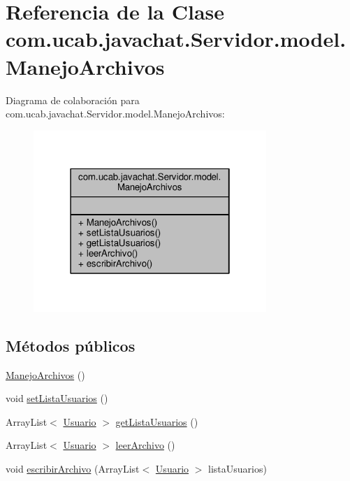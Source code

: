\hypertarget{classcom_1_1ucab_1_1javachat_1_1_servidor_1_1model_1_1_manejo_archivos}{\section{Referencia de la Clase com.\-ucab.\-javachat.\-Servidor.\-model.\-Manejo\-Archivos}
\label{classcom_1_1ucab_1_1javachat_1_1_servidor_1_1model_1_1_manejo_archivos}
}


Diagrama de colaboración para com.\-ucab.\-javachat.\-Servidor.\-model.\-Manejo\-Archivos\-:\nopagebreak
\begin{figure}[H]
\begin{center}
\leavevmode
\includegraphics[width=250pt]{classcom_1_1ucab_1_1javachat_1_1_servidor_1_1model_1_1_manejo_archivos__coll__graph}
\end{center}
\end{figure}
\subsection*{Métodos públicos}
\begin{DoxyCompactItemize}
\item 
\hyperlink{classcom_1_1ucab_1_1javachat_1_1_servidor_1_1model_1_1_manejo_archivos_a61dcba785a704949bc4b84a87a223463}{Manejo\-Archivos} ()
\item 
void \hyperlink{classcom_1_1ucab_1_1javachat_1_1_servidor_1_1model_1_1_manejo_archivos_a5776d41af3206be2ef21722c54581bdb}{set\-Lista\-Usuarios} ()
\item 
Array\-List$<$ \hyperlink{classcom_1_1ucab_1_1javachat_1_1_servidor_1_1model_1_1_usuario}{Usuario} $>$ \hyperlink{classcom_1_1ucab_1_1javachat_1_1_servidor_1_1model_1_1_manejo_archivos_a659469300b3d725e66d26460107200b6}{get\-Lista\-Usuarios} ()
\item 
Array\-List$<$ \hyperlink{classcom_1_1ucab_1_1javachat_1_1_servidor_1_1model_1_1_usuario}{Usuario} $>$ \hyperlink{classcom_1_1ucab_1_1javachat_1_1_servidor_1_1model_1_1_manejo_archivos_ad6301dc8f0af55ea43b53da2c7f8b0d3}{leer\-Archivo} ()
\item 
void \hyperlink{classcom_1_1ucab_1_1javachat_1_1_servidor_1_1model_1_1_manejo_archivos_af83311d7a6185ca621aad886e6633abd}{escribir\-Archivo} (Array\-List$<$ \hyperlink{classcom_1_1ucab_1_1javachat_1_1_servidor_1_1model_1_1_usuario}{Usuario} $>$ lista\-Usuarios)
\end{DoxyCompactItemize}


